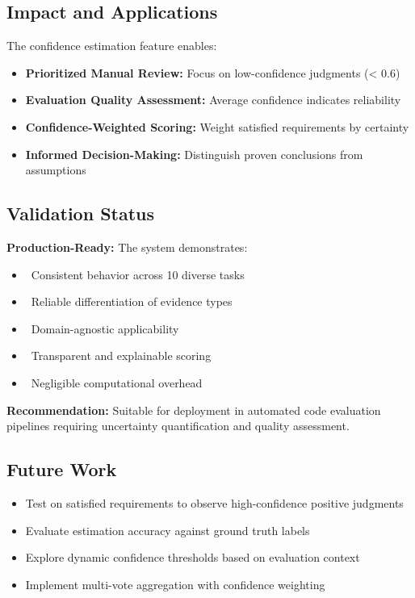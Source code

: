 \documentclass[11pt,a4paper]{article}
\begin{document}
\subsection{Impact and Applications}

The confidence estimation feature enables:

\begin{itemize}[leftmargin=*]
    \item \textbf{Prioritized Manual Review:} Focus on low-confidence judgments (< 0.6)
    \item \textbf{Evaluation Quality Assessment:} Average confidence indicates reliability
    \item \textbf{Confidence-Weighted Scoring:} Weight satisfied requirements by certainty
    \item \textbf{Informed Decision-Making:} Distinguish proven conclusions from assumptions
\end{itemize}

\subsection{Validation Status}

\textbf{Production-Ready:} The system demonstrates:
\begin{itemize}[leftmargin=*]
    \item \checkmark~Consistent behavior across 10 diverse tasks
    \item \checkmark~Reliable differentiation of evidence types
    \item \checkmark~Domain-agnostic applicability
    \item \checkmark~Transparent and explainable scoring
    \item \checkmark~Negligible computational overhead
\end{itemize}

\textbf{Recommendation:} Suitable for deployment in automated code evaluation pipelines requiring uncertainty quantification and quality assessment.

\subsection{Future Work}

\begin{itemize}[leftmargin=*]
    \item Test on satisfied requirements to observe high-confidence positive judgments
    \item Evaluate estimation accuracy against ground truth labels
    \item Explore dynamic confidence thresholds based on evaluation context
    \item Implement multi-vote aggregation with confidence weighting
\end{itemize}
\end{document}
